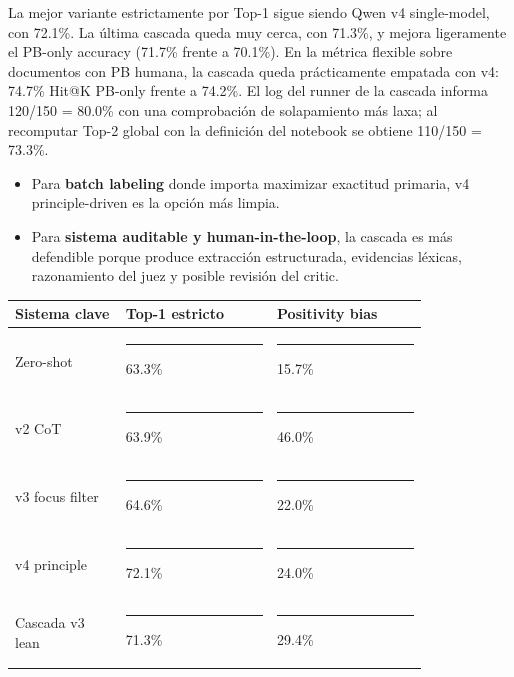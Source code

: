 La mejor variante estrictamente por Top-1 sigue siendo Qwen v4 single-model, con 72.1\%. La última cascada queda muy cerca, con 71.3\%, y mejora ligeramente el PB-only accuracy (71.7\% frente a 70.1\%). En la métrica flexible sobre documentos con PB humana, la cascada queda prácticamente empatada con v4: 74.7\% Hit@K PB-only frente a 74.2\%. El log del runner de la cascada informa 120/150 = 80.0\% con una comprobación de solapamiento más laxa; al recomputar Top-2 global con la definición del notebook se obtiene 110/150 = 73.3\%.

\begin{itemize}
\item Para \textbf{batch labeling} donde importa maximizar exactitud primaria, v4 principle-driven es la opción más limpia.
\item Para \textbf{sistema auditable y human-in-the-loop}, la cascada es más defendible porque produce extracción estructurada, evidencias léxicas, razonamiento del juez y posible revisión del critic.
\end{itemize}

\begin{center}
\scriptsize
\setlength{\tabcolsep}{5pt}
\renewcommand{\arraystretch}{1.2}
\begin{tabular}{p{0.22\linewidth}p{0.30\linewidth}p{0.30\linewidth}}
\toprule
Sistema clave & Top-1 estricto & Positivity bias \\
\midrule
Zero-shot & \rule{3.08cm}{0.8ex} 63.3\% & \rule{0.85cm}{0.8ex} 15.7\% \\
v2 CoT & \rule{3.11cm}{0.8ex} 63.9\% & \rule{2.50cm}{0.8ex} 46.0\% \\
v3 focus filter & \rule{3.14cm}{0.8ex} 64.6\% & \rule{1.20cm}{0.8ex} 22.0\% \\
v4 principle & \rule{3.50cm}{0.8ex} 72.1\% & \rule{1.30cm}{0.8ex} 24.0\% \\
Cascada v3 lean & \rule{3.46cm}{0.8ex} 71.3\% & \rule{1.60cm}{0.8ex} 29.4\% \\
\bottomrule
\end{tabular}
\end{center}



